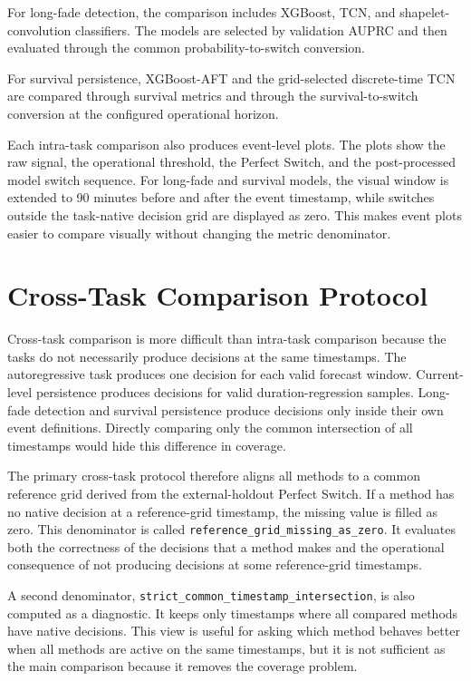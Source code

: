 For long-fade detection, the comparison includes XGBoost, TCN, and
shapelet-convolution classifiers. The models are selected by validation AUPRC
and then evaluated through the common probability-to-switch conversion.

For survival persistence, XGBoost-AFT and the grid-selected discrete-time TCN
are compared through survival metrics and through the survival-to-switch
conversion at the configured operational horizon.

Each intra-task comparison also produces event-level plots. The plots show the
raw signal, the operational threshold, the Perfect Switch, and the
post-processed model switch sequence. For long-fade and survival models, the
visual window is extended to 90 minutes before and after the event timestamp,
while switches outside the task-native decision grid are displayed as zero. This
makes event plots easier to compare visually without changing the metric
denominator.

\section{Cross-Task Comparison Protocol}
\label{sec:cross-task-comparison-protocol}

Cross-task comparison is more difficult than intra-task comparison because the
tasks do not necessarily produce decisions at the same timestamps. The
autoregressive task produces one decision for each valid forecast window.
Current-level persistence produces decisions for valid duration-regression
samples. Long-fade detection and survival persistence produce decisions only
inside their own event definitions. Directly comparing only the common
intersection of all timestamps would hide this difference in coverage.

The primary cross-task protocol therefore aligns all methods to a common
reference grid derived from the external-holdout Perfect Switch. If a method has
no native decision at a reference-grid timestamp, the missing value is filled as
zero. This denominator is called
\texttt{reference\_grid\_missing\_as\_zero}. It evaluates both the correctness of
the decisions that a method makes and the operational consequence of not
producing decisions at some reference-grid timestamps.

A second denominator,
\texttt{strict\_common\_timestamp\_intersection}, is also computed as a
diagnostic. It keeps only timestamps where all compared methods have native
decisions. This view is useful for asking which method behaves better when all
methods are active on the same timestamps, but it is not sufficient as the main
comparison because it removes the coverage problem.

